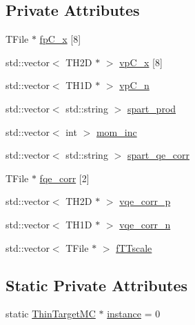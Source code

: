 \subsection*{Private Attributes}
\begin{DoxyCompactItemize}
\item 
T\-File $\ast$ \hyperlink{class_neutrino_flux_reweight_1_1_thin_target_m_c_ad270ba952a625cc54154e557e2517e05}{fp\-C\-\_\-x} \mbox{[}8\mbox{]}
\item 
std\-::vector$<$ T\-H2\-D $\ast$ $>$ \hyperlink{class_neutrino_flux_reweight_1_1_thin_target_m_c_a612fb4d230b0d597e299f67c50a71461}{vp\-C\-\_\-x} \mbox{[}8\mbox{]}
\item 
std\-::vector$<$ T\-H1\-D $\ast$ $>$ \hyperlink{class_neutrino_flux_reweight_1_1_thin_target_m_c_a929d19c1e5e17738376ecea2b91fe861}{vp\-C\-\_\-n}
\item 
std\-::vector$<$ std\-::string $>$ \hyperlink{class_neutrino_flux_reweight_1_1_thin_target_m_c_a8b097fbcafb5d79a77af2ca8324309a7}{spart\-\_\-prod}
\item 
std\-::vector$<$ int $>$ \hyperlink{class_neutrino_flux_reweight_1_1_thin_target_m_c_a039f1c0831ba09714b7ac1c9eca47a22}{mom\-\_\-inc}
\item 
std\-::vector$<$ std\-::string $>$ \hyperlink{class_neutrino_flux_reweight_1_1_thin_target_m_c_a475e8cd56d65e30e374d6f7ca4a20228}{spart\-\_\-qe\-\_\-corr}
\item 
T\-File $\ast$ \hyperlink{class_neutrino_flux_reweight_1_1_thin_target_m_c_ab0e2409c1f0e956fc5f37a77d8b82bb7}{fqe\-\_\-corr} \mbox{[}2\mbox{]}
\item 
std\-::vector$<$ T\-H2\-D $\ast$ $>$ \hyperlink{class_neutrino_flux_reweight_1_1_thin_target_m_c_afb3e3731f237e92476381c3e860c4ac9}{vqe\-\_\-corr\-\_\-p}
\item 
std\-::vector$<$ T\-H1\-D $\ast$ $>$ \hyperlink{class_neutrino_flux_reweight_1_1_thin_target_m_c_a3ea82c76544072b252ab905193cd7711}{vqe\-\_\-corr\-\_\-n}
\item 
std\-::vector$<$ T\-File $\ast$ $>$ \hyperlink{class_neutrino_flux_reweight_1_1_thin_target_m_c_a2ef318836e2368d80484d0dc8c95fdf9}{f\-T\-Tscale}
\end{DoxyCompactItemize}
\subsection*{Static Private Attributes}
\begin{DoxyCompactItemize}
\item 
static \hyperlink{class_neutrino_flux_reweight_1_1_thin_target_m_c}{Thin\-Target\-M\-C} $\ast$ \hyperlink{class_neutrino_flux_reweight_1_1_thin_target_m_c_a44231b5ccb5a2dee66a1f2ae167b33c8}{instance} = 0
\end{DoxyCompactItemize}


